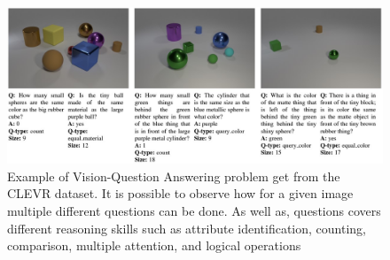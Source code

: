 \begin{figure}[t]
    \centering
    \includegraphics[width=1.0\textwidth]{figures/images/ch2/vqa_problem.jpg}
    \caption{Example of Vision-Question Answering problem get from the CLEVR \cite{johnson2017clevr} dataset. It is possible to observe how for a given image multiple different questions can be done. As well as, questions covers different reasoning skills such as attribute identification, counting, comparison, multiple attention, and logical operations}
    \label{fig:vqa_example}
\end{figure}
